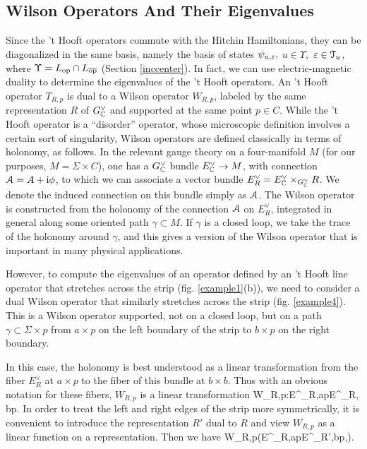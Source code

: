 \documentclass[11pt,a4paper]{article}
\begin{document}
\subsection{Wilson Operators And Their Eigenvalues}\label{wilop}

Since the 't Hooft operators commute with the Hitchin Hamiltonians, they can be 
diagonalized in the same basis, namely the basis of states $\psi_{u,\varepsilon},$ $u\in \Upsilon,$
$\varepsilon\in {\mathcal T}_u$,
where $\Upsilon=L_{\mathrm{op}}\cap L_{\overline{\mathrm{op}}}$ (Section \ref{inccenter}).   In fact, we can use electric-magnetic duality to determine the eigenvalues of the 't Hooft operators.   An 't Hooft operator
$T_{R,p}$ is dual to a Wilson operator $W_{R,p}$, labeled by the same representation $R$ of $G^\vee_{\mathbb C}$
and supported at the same point $p\in C$.   
While the 't Hooft operator is a ``disorder'' operator, whose microscopic definition involves a certain sort of singularity, Wilson operators are defined classically
in terms of holonomy, as follows.  In the relevant gauge theory on a four-manifold $M$ (for our purposes, $M=\Sigma\times C$), one has a 
$G^\vee_{\mathbb C}$ bundle $E^\vee_{\mathbb C}\to M$,
with connection ${\mathcal A}=A+{\mathrm i} \phi$, to which we can associate a vector bundle $E^\vee_R=E^\vee_{\mathbb C}\times_{G^\vee_{\mathbb C}} R$.   We denote the induced connection
on this bundle simply as ${\mathcal A}$.   The Wilson operator is constructed from the holonomy of the connection ${\mathcal A}$ on $E^\vee_R$, integrated in general
along some oriented path $\gamma\subset M$.   If $\gamma$ is a closed loop, we take the trace of the holonomy around $\gamma$, and this gives
a version of the Wilson operator that is important in many physical applications.   

However,  to compute the eigenvalues of an operator defined by an 't Hooft line operator that stretches across the strip
(fig. \ref{example1}(b)), we need to consider a dual Wilson operator that similarly stretches across the strip (fig. \ref{example4}).   
  This is a Wilson operator supported, not on a closed loop, but  on a path
$\gamma\subset \Sigma\times p$ from $a\times p$ on the left boundary of the strip to $b\times p$ on the right boundary.

  In this case, the holonomy
is best understood as a linear transformation from the fiber $E^\vee_R$ at $a\times p$ to the fiber of this bundle at $b\times b$.   Thus  with an obvious
notation for these fibers, $W_{R,p}$ is a linear transformation
\be\label{lintr} W_{R,p}:E^\vee_{R,a\times p}\to E^\vee_{R, b\times p}.\ee
In order to treat the left and right edges of the strip more symmetrically, it is convenient to introduce the representation $R'$ dual to $R$ and view
$W_{R,p}$ as a linear function on a representation.  Then we have
\be\label{bintr} W_{R,p}\in \Hom(E^\vee_{R,a\times p}\otimes E^\vee_{R',b\times p},\C). \ee
\end{document}
